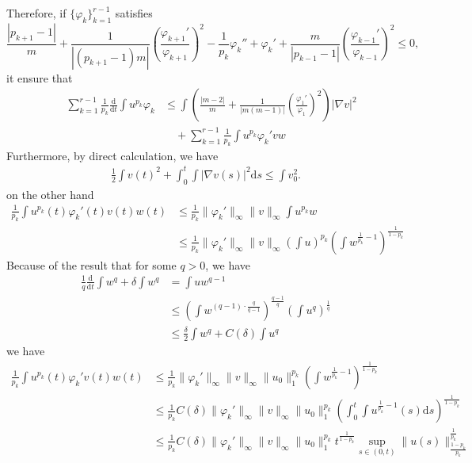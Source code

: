 \documentclass[12pt,]{article}
\begin{document}
Therefore, if $\{\varphi_k\}_{k=1}^{r-1}$ satisfies
\begin{equation}
\frac{|p_{k+1}-1|}{m}+\frac{1}{|(p_{k+1}-1)m|}\left(\frac{\varphi_{k+1}'}{\varphi_{k+1}}\right)^{2}-\frac{1}{p_k}\varphi_k'' +\varphi_k' +\frac{m}{|p_{k-1}-1|}\left(\frac{\varphi_{k-1}'}{\varphi_{k-1}}\right)^{2}\leqslant 0,
\end{equation}
it ensure that
\begin{equation}
  \begin{aligned}
    \quad\sum_{k=1}^{r-1}\frac{1}{p_k}\frac{\mathrm{d}}{\mathrm{d}t}\int u^{p_k}\varphi_k & \leqslant \int \left(\frac{|m-2|}{m}+\frac{1}{|m(m-1)|}\left(\frac{\varphi_1'}{\varphi_1}\right)^{2}\right)|\nabla v|^{2}\\
    & \quad + \sum_{k=1}^{r-1}\frac{1}{p_k}\int u^{p_k}\varphi_k'vw
  \end{aligned}
\end{equation}
Furthermore, by direct calculation, we have
\begin{equation}
\begin{aligned}
\frac{1}{2}\int v(t)^2 + \int_0^t\int |\nabla v(s)|^2\mathrm{d}s \leqslant \int v_0^2.
\end{aligned}
\end{equation}
on the other hand
\begin{equation}
\begin{aligned}
\frac{1}{p_k}\int u^{p_k}(t)\varphi_k'(t)v(t)w(t)&\leqslant \frac{1}{p_k}\|\varphi_k'\|_\infty\|v\|_\infty\int u^{p_k}w\\
&\leqslant\frac{1}{p_k}\|\varphi_k'\|_\infty\|v\|_\infty\left(\int u\right)^{p_k}\left(\int w^{\frac{1}{p_k}-1}\right)^{\frac{1}{1-p_k}}
\end{aligned}
\end{equation}
Because of the result that for some $q>0$, we have
\begin{equation}
\begin{aligned}
\frac{1}{q}\frac{\mathrm{d}}{\mathrm{d}t}\int w^q +\delta\int w^{q} &= \int uw^{q-1}\\
&\leqslant \left(\int w^{(q-1)\cdot\frac{q}{q-1}}\right)^{\frac{q-1}{q}}\left(\int u^{q}\right)^{\frac{1}{q}}\\
&\leqslant \frac{\delta}{2}\int w^{q} +C(\delta)\int u^{q}
\end{aligned}
\end{equation}
we have
\begin{equation}
\begin{aligned}
\frac{1}{p_k}\int u^{p_k}(t)\varphi_k'v(t)w(t)&\leqslant \frac{1}{p_k}\|\varphi_k'\|_\infty\|v\|_\infty\|u_0\|_1^{p_k}\left(\int w^{\frac{1}{p_k}-1}\right)^{\frac{1}{1-p_k}}\\
&\leqslant\frac{1}{p_k}C(\delta)\|\varphi_k'\|_\infty\|v\|_\infty\|u_0\|_1^{p_k}\left(\int_0^t\int u^{\frac{1}{p_k}-1}(s)\mathrm{d}s\right)^{\frac{1}{1-p_k}}\\
&\leqslant\frac{1}{p_k}C(\delta)\|\varphi_k'\|_\infty\|v\|_\infty\|u_0\|_1^{p_k}t^{\frac{1}{1-p_k}}\sup_{s\in(0,t)}\|u(s)\|_{\frac{1-p_k}{p_k}}^{\frac{1}{p_k}}
\end{aligned}
\end{equation}



% 
\end{document}
